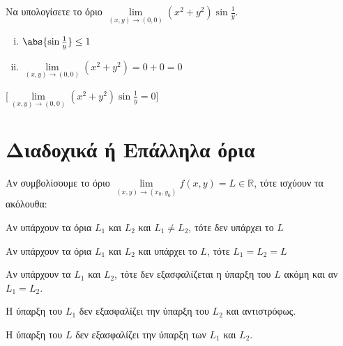 \begin{example}
  Να υπολογίσετε το όριο $ \lim\limits_{(x,y)\to (0, 0)} (x^{2}+y^{2}) 
  \sin{\frac{1}{y}} $.  

  \begin{solution}
  \item {}
    \begin{minipage}{0.4\textwidth}
      \begin{enumerate}[i)]
        \item $ \abs{\sin{\frac{1}{y}}} \leq 1 $ \hfill {}
        \item $ \lim\limits_{(x,y)\to (0, 0)} (x^{2}+y^{2}) = 0+0=0 $ 
          \hfill {}
      \end{enumerate}
    \end{minipage}
    [$ \lim\limits_{(x,y)\to (0, 0)} (x^{2}+y^{2}) \sin{\frac{1}{y}} 
    = 0$]
  \end{solution}
\end{example}


\section{Διαδοχικά ή Επάλληλα όρια}


\begin{rem}
  Αν συμβολίσουμε το όριο 
  $ \lim\limits_{(x,y)\to (x_{0}, y_{0})} f(x,y) = L \in \mathbb{R} $, τότε 
  ισχύουν τα ακόλουθα:
  \begin{myitemize}
    \item Αν υπάρχουν τα όρια $ L_{1} $ και $ L_{2} $ και $ L_{1} \neq L_{2} $, τότε
      δεν υπάρχει το $ L $
    \item Αν υπάρχουν τα όρια $ L_{1} $ και $ L_{2} $ και υπάρχει το $ L $, τότε
      $ L_{1}=L_{2}=L $
    \item Αν υπάρχουν τα $ L_{1} $ και $ L_{2} $, τότε δεν εξασφαλίζεται η ύπαρξη του 
      $ L $ ακόμη και αν $ L_{1}=L_{2} $.
    \item Η ύπαρξη του $ L_{1} $ δεν εξασφαλίζει την ύπαρξη του $ L_{2} $ και αντιστρόφως.
    \item Η ύπαρξη του $ L $ δεν εξασφαλίζει την ύπαρξη των $ L_{1} $ και $ L_{2} $.
  \end{myitemize}
\end{rem}

